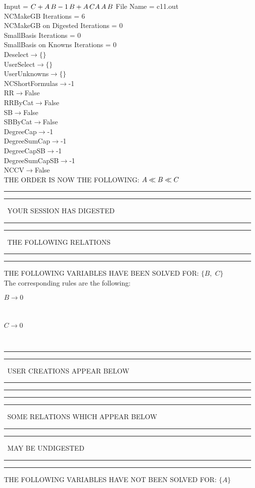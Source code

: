 \documentclass[rep10,leqno]{report}
\begin{document}
\normalsize
\baselineskip=12pt
\noindent
Input = 
$
\\C + A\,
 B\\
-1\,
 B + A\,
 C\\
A\,
 A\,
 B\\
$
File Name = c11.out\\
NCMakeGB Iterations = 6\\
NCMakeGB on Digested Iterations = 0\\
SmallBasis Iterations = 0\\
SmallBasis on Knowns Iterations = 0\\
Deselect$\rightarrow \{\}$\\
UserSelect$\rightarrow \{\}$\\
UserUnknowns$\rightarrow \{\}$\\
NCShortFormulas$\rightarrow$-1\\
RR$\rightarrow $False\\
RRByCat$\rightarrow $False\\
SB$\rightarrow $False\\
SBByCat$\rightarrow $False\\
DegreeCap$\rightarrow $-1\\
DegreeSumCap$\rightarrow $-1\\
DegreeCapSB$\rightarrow $-1\\
DegreeSumCapSB$\rightarrow $-1\\
NCCV$\rightarrow $False\\
THE ORDER IS NOW THE FOLLOWING:\hfil\break
$
A\ll
B\ll
C\\
$
\rule[2pt]{6in}{4pt}\hfil\break
\rule[2pt]{1.879in}{4pt}
\ YOUR SESSION HAS DIGESTED\ 
\rule[2pt]{1.879in}{4pt}\hfil\break
\rule[2pt]{1.923in}{4pt}
\ THE FOLLOWING RELATIONS\ 
\rule[2pt]{1.923in}{4pt}\hfil\break
\rule[2pt]{6in}{4pt}\hfil\break
THE FOLLOWING VARIABLES HAVE BEEN SOLVED FOR:\hfil\break
$\{B,
$ $
C\}$
\smallskip\\
The corresponding rules are the following:\smallskip\\
\begin{minipage}{6in}
$
B\rightarrow 0
$
\end{minipage}\medskip\\
\begin{minipage}{6in}
$
C\rightarrow 0
$
\end{minipage}\medskip\\
\rule[2pt]{6in}{1pt}\hfil\break
\rule[2.5pt]{1.701in}{1pt}
\ USER CREATIONS APPEAR BELOW\ 
\rule[2.5pt]{1.701in}{1pt}\hfil\break
\rule[2pt]{6in}{1pt}\hfil\break
\rule[2pt]{6in}{4pt}\hfil\break
\rule[2pt]{1.45in}{4pt}
\ SOME RELATIONS WHICH APPEAR BELOW\ 
\rule[2pt]{1.45in}{4pt}\hfil\break
\rule[2pt]{2.18in}{4pt}
\ MAY BE UNDIGESTED\ 
\rule[2pt]{2.18in}{4pt}\hfil\break
\rule[2pt]{6in}{4pt}\hfil\break
THE FOLLOWING VARIABLES HAVE NOT BEEN SOLVED FOR:\hfil\break
$\{A\}$
\smallskip\\
\vspace{10pt}
\end{document}
